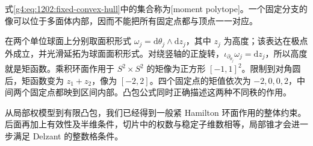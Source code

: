 式\eqref{g4:eq:1202:fixed-convex-hull}中的集合称为[moment polytope]。一个固定分支的像可以位于多面体内部，因而不能把所有固定点都与顶点一一对应。

\begin{example}\label{g4:exm:1202:diagonal-spheres}
	在两个单位球面上分别取面积形式 \(\omega_j=\mathrm d\theta_j\wedge\mathrm dz_j\)，其中 \(z_j\) 为高度；该表达在极点外成立，并光滑延拓为球面面积形式。对绕竖轴的正旋转，\(\iota_{\partial_{\theta_j}}\omega_j=\mathrm dz_j\)，所以高度就是矩函数。乘积环面作用于 \(S^2\times S^2\) 的矩像为正方形 \([-1,1]^2\)。限制到对角圆后，矩函数变为 \(z_1+z_2\)，像为 \([-2,2]\)。四个固定点的矩值依次为 \(-2,0,0,2\)，中间两个固定点都映到区间内部。凸包公式同时正确描述这两种不同秩的作用。
\end{example}

从局部权模型到有限凸包，我们已经得到一般紧 Hamilton 环面作用的整体约束。后面再加上有效性及半维条件，切片中的权数与稳定子维数相等，局部锥才会进一步满足 Delzant 的整数格条件。
